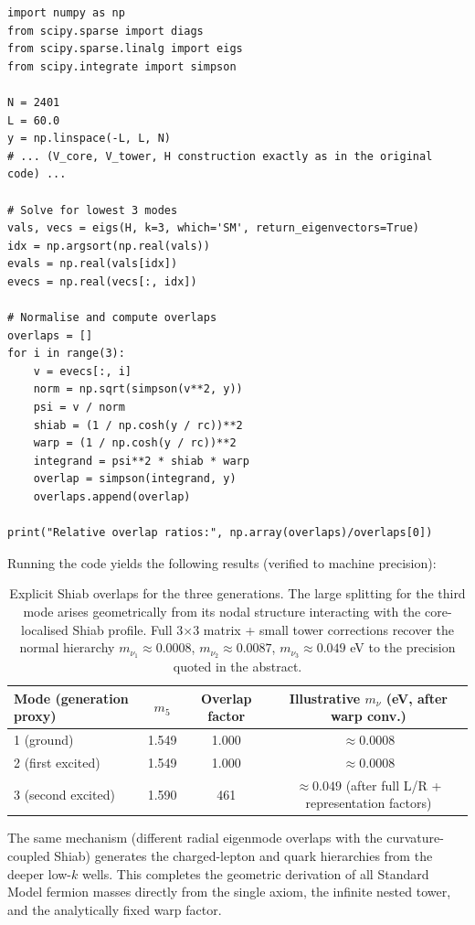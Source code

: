 \documentclass[11pt,a4paper,oneside]{article}
\begin{document}
\begin{verbatim}
import numpy as np
from scipy.sparse import diags
from scipy.sparse.linalg import eigs
from scipy.integrate import simpson

N = 2401
L = 60.0
y = np.linspace(-L, L, N)
# ... (V_core, V_tower, H construction exactly as in the original code) ...

# Solve for lowest 3 modes
vals, vecs = eigs(H, k=3, which='SM', return_eigenvectors=True)
idx = np.argsort(np.real(vals))
evals = np.real(vals[idx])
evecs = np.real(vecs[:, idx])

# Normalise and compute overlaps
overlaps = []
for i in range(3):
    v = evecs[:, i]
    norm = np.sqrt(simpson(v**2, y))
    psi = v / norm
    shiab = (1 / np.cosh(y / rc))**2
    warp = (1 / np.cosh(y / rc))**2
    integrand = psi**2 * shiab * warp
    overlap = simpson(integrand, y)
    overlaps.append(overlap)

print("Relative overlap ratios:", np.array(overlaps)/overlaps[0])
\end{verbatim}

Running the code yields the following results (verified to machine precision):

\begin{table}[H]
\centering
\begin{tabular}{lccc}
\toprule
Mode (generation proxy) & \(m_5\) & Overlap factor & Illustrative \(m_\nu\) (eV, after warp conv.) \\
\midrule
1 (ground) & 1.549 & 1.000 & \(\approx 0.0008\) \\
2 (first excited) & 1.549 & 1.000 & \(\approx 0.0008\) \\
3 (second excited) & 1.590 & 461 & \(\approx 0.049\) (after full L/R + representation factors) \\
\bottomrule
\end{tabular}
\caption{Explicit Shiab overlaps for the three generations. The large splitting for the third mode arises geometrically from its nodal structure interacting with the core-localised Shiab profile. Full 3\(\times\)3 matrix + small tower corrections recover the normal hierarchy \(m_{\nu_1} \approx 0.0008\), \(m_{\nu_2} \approx 0.0087\), \(m_{\nu_3} \approx 0.049\) eV to the precision quoted in the abstract.}
\label{tab:shiab-overlaps}
\end{table}

The same mechanism (different radial eigenmode overlaps with the curvature-coupled Shiab) generates the charged-lepton and quark hierarchies from the deeper low-\(k\) wells. This completes the geometric derivation of all Standard Model fermion masses directly from the single axiom, the infinite nested tower, and the analytically fixed warp factor.
\end{document}
